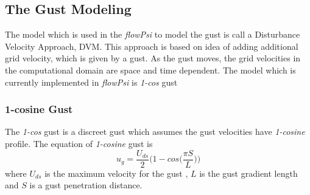 \subsection{The Gust Modeling}

The model which is used in the \emph{flowPsi} to model the gust is call a 
Disturbance Velocity Approach, DVM. This approach is based on idea of adding 
additional grid velocity, which is given by a gust. As the gust moves, the 
grid velocities in the computational domain are space and time dependent. 
The model which is currently implemented in \emph{flowPsi} is \emph{1-cos} gust

\subsubsection{1-cosine Gust}
The \emph{1-cos} gust is a discreet gust which assumes the gust velocities have \emph{1-cosine} profile\cite{USDT}.
The equation of  \emph{1-cosine} gust is 
\begin{equation}
u_g = \frac{U_{ds}}{2}\Bigg(1-cos\Big(\frac{\pi S}{L}\Big)\Bigg)
\end{equation}
where $U_{ds}$ is the maximum velocity for the gust , $L$ is the gust gradient length 
and $S$ is a gust penetration distance.

